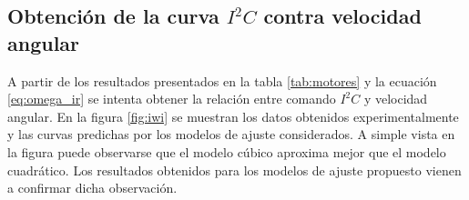 \documentclass[main]{subfiles}
\begin{document}
\begin{figure}[H]
  \vspace{-20pt}
\hspace{-50pt}
  \vspace{-5pt}
  \caption{}  
  \vspace{-10pt}
\end{figure}

\subsection{Obtenci\'on de la curva $I^2C$ contra velocidad angular}

A partir de los resultados presentados en la tabla \ref{tab:motores} y la ecuaci\'on \ref{eq:omega_ir} se intenta obtener la relaci\'on entre comando $I^2C$ y velocidad angular. En la figura \ref{fig:iwi} se muestran los datos obtenidos experimentalmente y las curvas predichas por los modelos de ajuste considerados. A simple vista en la figura puede observarse que el modelo c\'ubico aproxima mejor que el modelo cuadr\'atico.
Los resultados obtenidos para los modelos de ajuste propuesto vienen a confirmar dicha observaci\'on.\\
\end{document}
